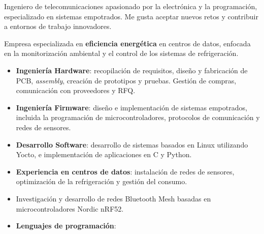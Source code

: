 \documentclass[10pt,a4paper,ragged2e,withhyper]{altacv}
\begin{document}
\begin{paracol}{2}


Ingeniero de telecomunicaciones apasionado por la electrónica y la programación, especializado en sistemas empotrados. Me gusta aceptar nuevos retos y contribuir a entornos de trabajo innovadores.



Empresa especializada en \textbf{eficiencia energética} en centros de datos, enfocada en la monitorización ambiental y el control de los sistemas de refrigeración.

\begin{itemize}
    \item \textbf{Ingeniería Hardware}: recopilación de requisitos, diseño y fabricación de PCB, \textit{assembly}, creación de prototipos y pruebas. Gestión de compras, comunicación con proveedores y RFQ.
    \item \textbf{Ingeniería Firmware}: diseño e implementación de sistemas empotrados, incluida la programación de microcontroladores, protocolos de comunicación y redes de sensores.
    \item \textbf{Desarrollo Software}: desarrollo de sistemas basados en Linux utilizando Yocto, e implementación de aplicaciones en C y Python.
    \item \textbf{Experiencia en centros de datos}: instalación de redes de sensores, optimización de la refrigeración y gestión del consumo.
\end{itemize}

\divider

\begin{itemize}
    \item Investigación y desarrollo de redes Bluetooth Mesh basadas en microcontroladores Nordic nRF52.
\end{itemize}


\begin{itemize}
  \item \textbf{Lenguajes de programación}:
  

\end{itemize}
\end{paracol}
\end{document}
